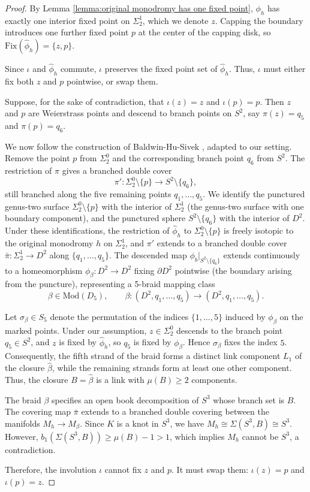 \begin{proof}
By Lemma \ref{lemma:original monodromy has one fixed point}, $\phi_h$ has exactly one interior fixed point on $\Sigma_2^1$, which we denote $z$. Capping the boundary introduces one further fixed point $p$ at the center of the capping disk, so $\mathrm{Fix}(\hat{\phi}_h) = \{z, p\}$.

Since $\iota$ and $\hat{\phi}_h$ commute, $\iota$ preserves the fixed point set of $\hat{\phi}_h$. Thus, $\iota$ must either fix both $z$ and $p$ pointwise, or swap them.

Suppose, for the sake of contradiction, that $\iota(z) = z$ and $\iota(p) = p$. Then $z$ and $p$ are Weierstrass points and descend to branch points on $S^2$, say $\pi(z) = q_5$ and $\pi(p) = q_6$.

We now follow the construction of Baldwin-Hu-Sivek \cite[Proof of Theorem 3.1]{baldwin2025khovanov}, adapted to our setting. Remove the point $p$ from $\Sigma_2^0$ and the corresponding branch point $q_6$ from $S^2$. The restriction of $\pi$ gives a branched double cover
\[
\pi' \colon \Sigma_2^0 \setminus \{p\} \to S^2 \setminus \{q_6\},
\]
still branched along the five remaining points $q_1, \ldots, q_5$. We identify the punctured genus-two surface $\Sigma_2^0 \setminus \{p\}$ with the interior of $\Sigma_2^1$ (the genus-two surface with one boundary component), and the punctured sphere $S^2 \setminus \{q_6\}$ with the interior of $D^2$. Under these identifications, the restriction of $\hat{\phi}_h$ to $\Sigma_2^0 \setminus \{p\}$ is freely isotopic to the original monodromy $h$ on $\Sigma_2^1$, and $\pi'$ extends to a branched double cover $\bar\pi \colon \Sigma_2^1 \to D^2$ along $\{q_1, \ldots, q_5\}$. The descended map $\phi_b|_{S^2 \setminus \{q_6\}}$ extends continuously to a homeomorphism $\phi_\beta \colon D^2 \to D^2$ fixing $\partial D^2$ pointwise (the boundary arising from the puncture), representing a 5-braid mapping class
\[
\beta \in \mathrm{Mod}(D_5), \qquad \beta \colon (D^2, q_1,\dots,q_5) \to (D^2, q_1,\dots,q_5).
\]

Let $\sigma_\beta \in S_5$ denote the permutation of the indices $\{1,\ldots,5\}$ induced by $\phi_\beta$ on the marked points. Under our assumption, $z \in \Sigma_2^0$ descends to the branch point $q_5 \in S^2$, and $z$ is fixed by $\hat{\phi}_h$, so $q_5$ is fixed by $\phi_\beta$. Hence $\sigma_\beta$ fixes the index $5$. Consequently, the fifth strand of the braid forms a distinct link component $L_1$ of the closure $\hat{\beta}$, while the remaining strands form at least one other component. Thus, the closure $B = \hat{\beta}$ is a link with $\mu(B) \ge 2$ components.

The braid $\beta$ specifies an open book decomposition of $S^3$ whose branch set is $B$. The covering map $\bar\pi$ extends to a branched double covering between the manifolds $M_h \to M_\beta$. Since $K$ is a knot in $S^3$, we have $M_h \cong \Sigma(S^3,B) \cong S^3$. However, $b_1(\Sigma(S^3, B)) \ge \mu(B) - 1 > 1$, which implies $M_h$ cannot be $S^3$, a contradiction.

Therefore, the involution $\iota$ cannot fix $z$ and $p$. It must swap them: $\iota(z) = p$ and $\iota(p) = z$.
\end{proof}

